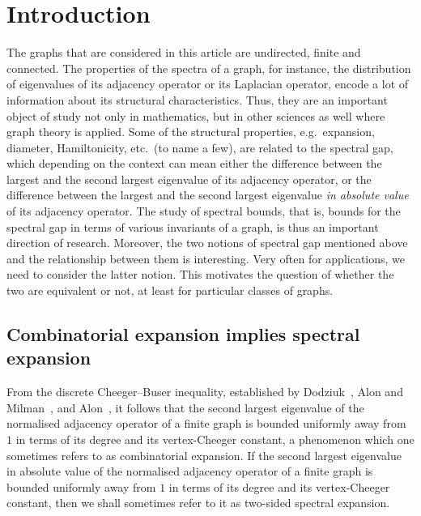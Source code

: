 \section{Introduction}

The graphs that are considered in this article are undirected, finite and connected. The properties of the spectra of a graph, for instance, the distribution of eigenvalues of its adjacency operator or its Laplacian operator, encode a lot of information about its structural characteristics. Thus, they are an important object of study not only in mathematics, but in other sciences as well where graph theory is applied. Some of the structural properties, e.g.~expansion, diameter, Hamiltonicity, etc.~(to name a few), are related to the spectral gap, which depending on the context can mean either the difference between the largest and the second largest eigenvalue of its adjacency operator, or the difference between the largest and the second largest eigenvalue \emph{in absolute value} of its adjacency operator. The study of spectral bounds, that is, bounds for the spectral gap in terms of various invariants of a graph, is thus an important direction of research. Moreover, the two notions of spectral gap mentioned above and the relationship between them is interesting. Very often for applications, we need to consider the latter notion. This motivates the question of whether the two are equivalent or not, at least for particular classes of graphs.

\subsection{Combinatorial expansion implies spectral expansion}
From the discrete Cheeger--Buser inequality, established by Dodziuk~\cite{DodziukDifferenceEqnIsoperimetricIneq}, Alon and Milman~\cite{AlonMilmanIsoperiIneqSupConcen}, and Alon~\cite{AlonEigenvalueExpand}, it follows that the second largest eigenvalue of the normalised adjacency operator of a finite graph is bounded uniformly away from $1$ in terms of its degree and its vertex-Cheeger constant, a phenomenon which one sometimes refers to as combinatorial expansion. If the second largest eigenvalue in absolute value of the normalised adjacency operator of a finite graph is bounded uniformly away from $1$ in terms of its degree and its vertex-Cheeger constant, then we shall sometimes refer to it as two-sided spectral expansion.

